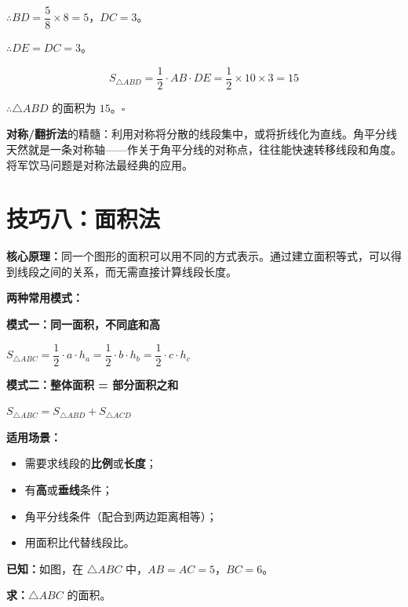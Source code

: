 \documentclass[12pt, a4paper]{ctexart}
\begin{document}
\(\therefore BD = \dfrac{5}{8} \times 8 = 5\)，\(DC = 3\)。

\(\therefore DE = DC = 3\)。

\[S_{\triangle ABD} = \frac{1}{2} \cdot AB \cdot DE = \frac{1}{2} \times 10 \times 3 = 15\]

\(\therefore \triangle ABD\) 的面积为 \(15\)。\hfill\(\square\)

\begin{tipbox}[方法总结]
\textbf{对称/翻折法}的精髓：利用对称将分散的线段集中，或将折线化为直线。角平分线天然就是一条对称轴——作关于角平分线的对称点，往往能快速转移线段和角度。将军饮马问题是对称法最经典的应用。
\end{tipbox}

\section*{\textcolor{mainblue}{技巧八：面积法}}

\begin{knowledgebox}[什么是面积法？]
\textbf{核心原理：}同一个图形的面积可以用不同的方式表示。通过建立面积等式，可以得到线段之间的关系，而无需直接计算线段长度。

\medskip
\noindent\textbf{两种常用模式：}

\textbf{模式一：同一面积，不同底和高}

\(S_{\triangle ABC} = \dfrac{1}{2} \cdot a \cdot h_a = \dfrac{1}{2} \cdot b \cdot h_b = \dfrac{1}{2} \cdot c \cdot h_c\)

\textbf{模式二：整体面积 = 部分面积之和}

\(S_{\triangle ABC} = S_{\triangle ABD} + S_{\triangle ACD}\)

\medskip
\noindent\textbf{适用场景：}
\begin{itemize}[leftmargin=1.5em]
  \item 需要求线段的\textbf{比例}或\textbf{长度}；
  \item 有\textbf{高}或\textbf{垂线}条件；
  \item 角平分线条件（配合到两边距离相等）；
  \item 用面积比代替线段比。
\end{itemize}
\end{knowledgebox}

\begin{examplebox}[【例题 8-1】同一面积不同表示]
\textbf{已知：}如图，在 \(\triangle ABC\) 中，\(AB = AC = 5\)，\(BC = 6\)。

\textbf{求：}\(\triangle ABC\) 的面积。
\end{examplebox}
\end{document}
